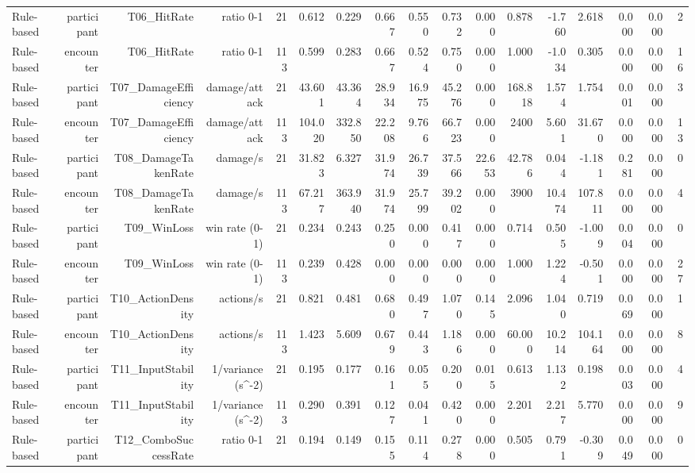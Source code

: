 \documentclass[10pt]{article}
\begin{document}
{\begin{longtable}{lrrrrrrrrrrrrrrrr}
Rule-based & participant & T06\_HitRate & ratio 0-1 & 21 & 0.612 & 0.229 & 0.667 & 0.550 & 0.732 & 0.000 & 0.878 & -1.760 & 2.618 & 0.000 & 0.000 & 2 \\
Rule-based & encounter & T06\_HitRate & ratio 0-1 & 113 & 0.599 & 0.283 & 0.667 & 0.524 & 0.750 & 0.000 & 1.000 & -1.034 & 0.305 & 0.000 & 0.000 & 16 \\
Rule-based & participant & T07\_DamageEfficiency & damage/attack & 21 & 43.601 & 43.364 & 28.934 & 16.975 & 45.276 & 0.000 & 168.818 & 1.574 & 1.754 & 0.001 & 0.000 & 3 \\
Rule-based & encounter & T07\_DamageEfficiency & damage/attack & 113 & 104.020 & 332.850 & 22.208 & 9.766 & 66.723 & 0.000 & 2400 & 5.601 & 31.670 & 0.000 & 0.000 & 13 \\
Rule-based & participant & T08\_DamageTakenRate & damage/s & 21 & 31.823 & 6.327 & 31.974 & 26.739 & 37.566 & 22.653 & 42.786 & 0.044 & -1.181 & 0.281 & 0.000 & 0 \\
Rule-based & encounter & T08\_DamageTakenRate & damage/s & 113 & 67.217 & 363.940 & 31.974 & 25.799 & 39.202 & 0.000 & 3900 & 10.474 & 107.811 & 0.000 & 0.000 & 4 \\
Rule-based & participant & T09\_WinLoss & win rate (0-1) & 21 & 0.234 & 0.243 & 0.250 & 0.000 & 0.417 & 0.000 & 0.714 & 0.505 & -1.009 & 0.004 & 0.000 & 0 \\
Rule-based & encounter & T09\_WinLoss & win rate (0-1) & 113 & 0.239 & 0.428 & 0.000 & 0.000 & 0.000 & 0.000 & 1.000 & 1.224 & -0.501 & 0.000 & 0.000 & 27 \\
Rule-based & participant & T10\_ActionDensity & actions/s & 21 & 0.821 & 0.481 & 0.680 & 0.497 & 1.070 & 0.145 & 2.096 & 1.040 & 0.719 & 0.069 & 0.000 & 1 \\
Rule-based & encounter & T10\_ActionDensity & actions/s & 113 & 1.423 & 5.609 & 0.679 & 0.443 & 1.186 & 0.000 & 60.000 & 10.214 & 104.164 & 0.000 & 0.000 & 8 \\
Rule-based & participant & T11\_InputStability & 1/variance (s\textasciicircum{}-2) & 21 & 0.195 & 0.177 & 0.161 & 0.055 & 0.200 & 0.015 & 0.613 & 1.132 & 0.198 & 0.003 & 0.000 & 4 \\
Rule-based & encounter & T11\_InputStability & 1/variance (s\textasciicircum{}-2) & 113 & 0.290 & 0.391 & 0.127 & 0.041 & 0.420 & 0.000 & 2.201 & 2.217 & 5.770 & 0.000 & 0.000 & 9 \\
Rule-based & participant & T12\_ComboSuccessRate & ratio 0-1 & 21 & 0.194 & 0.149 & 0.155 & 0.114 & 0.278 & 0.000 & 0.505 & 0.791 & -0.309 & 0.049 & 0.000 & 0 \\

\end{longtable}}
\end{document}
